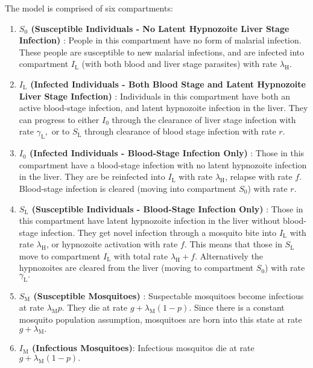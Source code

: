 The model is comprised of six compartments: \begin{enumerate}
    \item \textbf{
              $S_0$ (Susceptible Individuals - No Latent Hypnozoite Liver
              Stage Infection)
          }: People in this compartment have no form of malarial infection.
          These people are susceptible to new malarial infections,
          and are infected into compartment $I_\mathrm{L}$ (with both blood
          and liver stage parasites) with rate $\lambda_\mathrm{H}$.
    \item \textbf{
              $I_\mathrm{L}$ (Infected Individuals - Both Blood Stage and Latent
              Hypnozoite Liver Stage Infection)
          }:  Individuals in this compartment have both an active blood-stage
          infection, and latent hypnozoite infection in the liver. They can
          progress to either $I_0$ through the clearance of liver stage
          infection with rate $\gamma_\mathrm{L},$ or to $S_\mathrm{L}$ through
          clearance of blood stage infection with rate $r$.
    \item \textbf{
              $I_0$ (Infected Individuals - Blood-Stage Infection Only)
          }: Those in this compartment have a blood-stage infection with no
          latent hypnozoite infection in the liver. They are be reinfected into
          $I_\mathrm{L}$ with rate $\lambda_\mathrm{H}$, relapse with rate $f$.
          Blood-stage infection is cleared (moving into compartment $S_0$) with
          rate $r$.
    \item \textbf{
              $S_\mathrm{L}$ (Susceptible Individuals -
              Blood-Stage Infection Only)
          }: Those in this compartment have latent hypnozoite infection in
          the liver without blood-stage infection. They get novel infection
          through a mosquito bite into $I_\mathrm{L}$ with rate
          $\lambda_\mathrm{H}$, or hypnozoite activation with rate $f$.
          This means that those in $S_\mathrm{L}$ move to compartment
          $I_\mathrm{L}$ with total rate $\lambda_\mathrm{H} + f.$
          Alternatively the hypnozoites are cleared from the liver
          (moving to compartment $S_0$) with rate $\gamma_\mathrm{L}.$
    \item \textbf{
              $S_\mathrm{M}$ (Susceptible Mosquitoes)
          }:
          Suspectable mosquitoes become infectious at rate
          $\lambda_\mathrm{M}p.$ They die at rate
          $g + \lambda_\mathrm{M}(1 - p).$ Since there is a constant mosquito
          population assumption, mosquitoes are born into this state at rate
          $g + \lambda_\mathrm{M}.$
    \item \textbf{$I_\mathrm{M}$ (Infectious Mosquitoes)}:
          Infectious mosquitos die at rate $g + \lambda_\mathrm{M}(1 - p).$
\end{enumerate}

